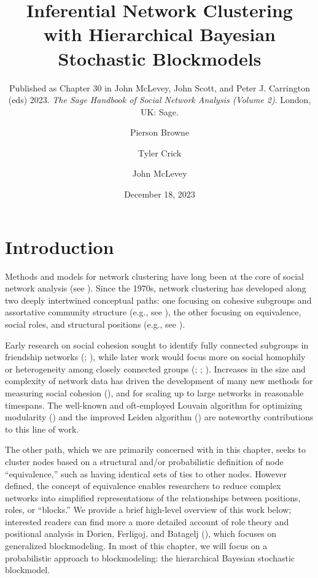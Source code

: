 \documentclass[
  12pt,
  a4paper,
  DIV=11,
  numbers=noendperiod,
  twoside,
  open=any]{scrartcl}
\title{Inferential Network Clustering with Hierarchical Bayesian
Stochastic Blockmodels}
\subtitle{Published as Chapter 30 in John McLevey, John Scott, and Peter
J. Carrington (eds) 2023. \emph{The Sage Handbook of Social Network
Analysis (Volume 2)}. London, UK: Sage.}
\author{Pierson Browne \and Tyler Crick \and John McLevey}
\date{December 18, 2023}
\begin{document}
\maketitle

\section{Introduction}\label{introduction}

Methods and models for network clustering have long been at the core of
social network analysis (see
). Since the 1970s, network clustering has developed along two
deeply intertwined conceptual paths: one focusing on cohesive subgroups
and assortative community structure (e.g., see
), the other
focusing on equivalence, social roles, and structural positions (e.g.,
see ).

Early research on social cohesion sought to identify fully connected
subgroups in friendship networks
(;
), while later work
would focus more on social homophily or heterogeneity among closely
connected groups (;
;
). Increases in the
size and complexity of network data has driven the development of many
new methods for measuring social cohesion
(), and for
scaling up to large networks in reasonable timespans. The well-known and
oft-employed Louvain algorithm for optimizing modularity
() and the improved
Leiden algorithm () are noteworthy contributions to this line of work.

The other path, which we are primarily concerned with in this chapter,
seeks to cluster nodes based on a structural and/or probabilistic
definition of node ``equivalence,'' such as having identical sets of
ties to other nodes. However defined, the concept of equivalence enables
researchers to reduce complex networks into simplified representations
of the relationships between positions, roles, or ``blocks.'' We provide
a brief high-level overview of this work below; interested readers can
find more a more detailed account of role theory and positional analysis
in Dorien, Ferligoj, and Batagelj
(), which focuses on generalized
blockmodeling. In most of this chapter, we will focus on a probabilistic
approach to blockmodeling: the hierarchical Bayesian stochastic
blockmodel.
\end{document}
